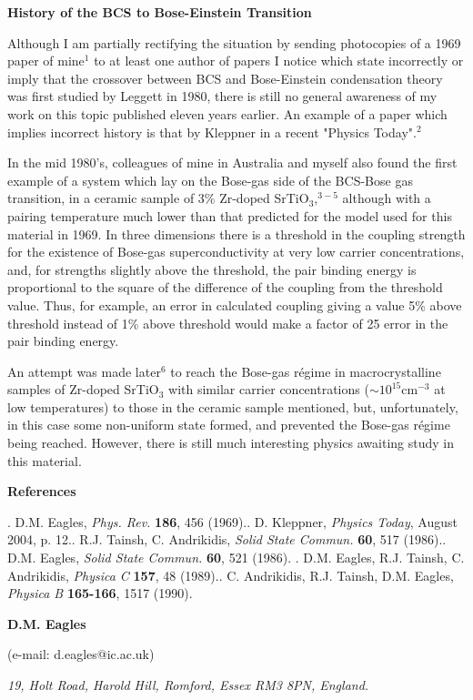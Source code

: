 \documentclass[11pt]{article}
\begin{document}
\noindent
{\bf History of the BCS to Bose-Einstein Transition}

\noindent
Although I am partially rectifying the situation by sending photocopies
of a 1969 paper of mine$^{1}$ to at least one author of papers I notice
which state incorrectly or imply that the crossover between BCS 
and Bose-Einstein condensation theory was first studied by Leggett in
1980, there is still no general awareness of my work on this topic
published eleven years earlier.  An example of a paper which implies
incorrect history is that by Kleppner in a recent "Physics
Today".$^{2}$

\noindent
In the mid 1980's, colleagues of mine in Australia and myself also
found the first example of a system which lay on the Bose-gas side of
the BCS-Bose gas transition, in a ceramic sample of 3\% Zr-doped
SrTiO$_3$,$^{3-5}$ although with a pairing temperature much lower than
that predicted for the model used for this material in 1969.  In three
dimensions there is a threshold in the coupling strength for the
existence of Bose-gas superconductivity at very low carrier
concentrations, and, for strengths slightly above the threshold, the
pair binding energy is proportional to the square of the difference of
the coupling from the threshold value.  Thus, for example, an error in
calculated coupling giving a value 5\% above threshold instead of 1\%
above threshold would make a factor of 25 error in the pair binding
energy.

\noindent
An attempt was made later$^{6}$ to reach the Bose-gas r\'{e}gime in
macrocrystalline samples of Zr-doped SrTiO$_3$ with similar carrier
concentrations ($\sim 10^{15}$cm$^{-3}$ at low temperatures) to
those in the ceramic sample mentioned, but, unfortunately, in this case
some non-uniform state formed, and prevented the Bose-gas r\'{e}gime
being reached.  However, there is still much interesting physics
awaiting study in this material.

\noindent
{\bf References}

. D.M. Eagles, {\em Phys. Rev.} {\bf 186}, 456 (1969).. D. Kleppner, {\em Physics Today}, August 2004, p. 12.. R.J. Tainsh, C. Andrikidis, {\em Solid State Commun.} {\bf 60},
517 (1986).. D.M. Eagles, {\em Solid State Commun.} {\bf 60}, 521 (1986). 
. D.M. Eagles, R.J. Tainsh, C. Andrikidis,  {\em Physica C} {\bf 157}, 48
(1989).. C. Andrikidis, R.J. Tainsh, D.M. Eagles, {\em Physica B} {\bf 165-166}, 
1517 (1990).
       
{\bf D.M. Eagles} 

(e-mail: d.eagles@ic.ac.uk)

\noindent
{\em 19, Holt Road, Harold Hill, Romford, Essex RM3 8PN, England.}
\end{document}
